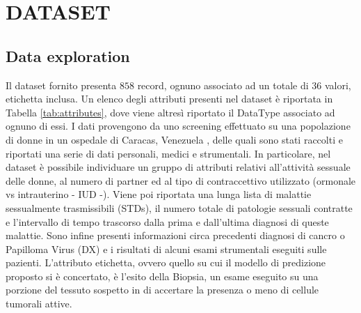 \section{DATASET}
\subsection{Data exploration}
Il dataset fornito presenta $858$ record, ognuno associato ad un totale di $36$ valori, etichetta inclusa. Un elenco degli attributi presenti nel dataset è riportata in Tabella \ref{tab:attributes}, dove viene altresì riportato il DataType associato ad ognuno di essi. I dati provengono da uno screening effettuato su una popolazione di donne in un ospedale di Caracas, Venezuela \cite{ML}, delle quali sono stati raccolti e riportati una serie di dati personali, medici e strumentali. In particolare, nel dataset è possibile individuare un gruppo di attributi relativi all'attività sessuale delle donne, al numero di partner ed al tipo di contraccettivo utilizzato (ormonale vs intrauterino - IUD -). Viene poi riportata una lunga lista di malattie sessualmente trasmissibili (STDs), il numero totale di patologie sessuali contratte e l'intervallo di tempo trascorso dalla prima e dall'ultima diagnosi di queste malattie. Sono infine presenti informazioni circa precedenti diagnosi di cancro o Papilloma Virus (DX) e i risultati di alcuni esami strumentali eseguiti sulle pazienti. L'attributo etichetta, ovvero quello su cui il modello di predizione proposto si è concertato, è l'esito della Biopsia, un esame eseguito su una porzione del tessuto sospetto in di accertare la presenza o meno di cellule tumorali attive. 
